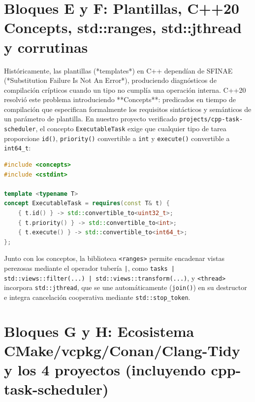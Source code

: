 \documentclass{book}
\begin{document}
\section{Bloques E y F: Plantillas, C++20 Concepts, std::ranges, std::jthread y corrutinas}

Históricamente, las plantillas (*templates*) en C++ dependían de SFINAE (*Substitution Failure Is Not An Error*), produciendo diagnósticos de compilación crípticos cuando un tipo no cumplía una operación interna. C++20 resolvió este problema introduciendo **Concepts**: predicados en tiempo de compilación que especifican formalmente los requisitos sintácticos y semánticos de un parámetro de plantilla. En nuestro proyecto verificado \texttt{projects/cpp-task-scheduler}, el concepto \texttt{ExecutableTask} exige que cualquier tipo de tarea proporcione \texttt{id()}, \texttt{priority()} convertible a \texttt{int} y \texttt{execute()} convertible a \texttt{int64\_t}:
\begin{lstlisting}[style=studium,language={C++}]
#include <concepts>
#include <cstdint>

template <typename T>
concept ExecutableTask = requires(const T& t) {
    { t.id() } -> std::convertible_to<uint32_t>;
    { t.priority() } -> std::convertible_to<int>;
    { t.execute() } -> std::convertible_to<int64_t>;
};
\end{lstlisting}
Junto con los conceptos, la biblioteca \texttt{<ranges>} permite encadenar vistas perezosas mediante el operador tubería \texttt{|}, como \texttt{tasks | std::views::filter(...) | std::views::transform(...)}, y \texttt{<thread>} incorpora \texttt{std::jthread}, que se une automáticamente (\texttt{join()}) en su destructor e integra cancelación cooperativa mediante \texttt{std::stop\_token}.

\section{Bloques G y H: Ecosistema CMake/vcpkg/Conan/Clang-Tidy y los 4 proyectos (incluyendo cpp-task-scheduler)}
\end{document}
